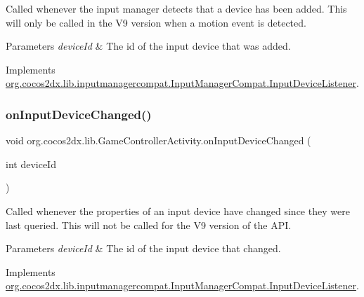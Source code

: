 Called whenever the input manager detects that a device has been added. This will only be called in the V9 version when a motion event is detected.


\begin{DoxyParams}{Parameters}
{\em device\+Id} & The id of the input device that was added. \\
\hline
\end{DoxyParams}


Implements \hyperlink{interfaceorg_1_1cocos2dx_1_1lib_1_1inputmanagercompat_1_1InputManagerCompat_1_1InputDeviceListener_aade58bcb9003c24590ac0907d66406dc}{org.\+cocos2dx.\+lib.\+inputmanagercompat.\+Input\+Manager\+Compat.\+Input\+Device\+Listener}.

\mbox{\label{classorg_1_1cocos2dx_1_1lib_1_1GameControllerActivity_a26ce9a1e1b6f4a726d6c775633a80b03}} 
\subsubsection{\texorpdfstring{on\+Input\+Device\+Changed()}{onInputDeviceChanged()}\hspace{0.1cm}{\footnotesize\ttfamily [1/2]}}
{\footnotesize\ttfamily void org.\+cocos2dx.\+lib.\+Game\+Controller\+Activity.\+on\+Input\+Device\+Changed (\begin{DoxyParamCaption}\item[{int}]{device\+Id }\end{DoxyParamCaption})\hspace{0.3cm}{\ttfamily [inline]}}

Called whenever the properties of an input device have changed since they were last queried. This will not be called for the V9 version of the A\+PI.


\begin{DoxyParams}{Parameters}
{\em device\+Id} & The id of the input device that changed. \\
\hline
\end{DoxyParams}


Implements \hyperlink{interfaceorg_1_1cocos2dx_1_1lib_1_1inputmanagercompat_1_1InputManagerCompat_1_1InputDeviceListener_af65cf1e0f73f2a7326a8ea62f6764361}{org.\+cocos2dx.\+lib.\+inputmanagercompat.\+Input\+Manager\+Compat.\+Input\+Device\+Listener}.

